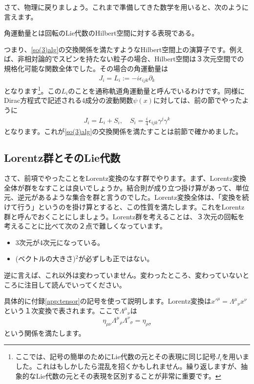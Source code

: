 \documentclass[report,paper=a4, fontsize=12pt, line_length=16cm, number_of_lines=33,dvipdfmx]{jlreq}
\newenvironment{myquote}{\begin{tcolorbox}[
  colback = blue!5, after = \noindent] }{\end{tcolorbox}}
\numberwithin{equation}{chapter}
\newcommand{\del}{\partial}
\begin{document}
さて、物理に戻りましょう。これまで準備してきた数学を用いると、次のように言えます。
\begin{myquote}
  角運動量とは回転のLie代数のHilbert空間に対する表現である。
\end{myquote}
つまり、\eqref{so(3)alg}の交換関係を満たすようなHilbert空間上の演算子です。例えば、非相対論的でスピンを持たない粒子の場合、Hilbert空間は３次元空間での規格化可能な関数全体でした。その場合の角運動量は
\begin{align}
  J_i=L_i:=-i\epsilon_{ijk}\del_{k}
\end{align}
となります\footnote{ここでは、記号の簡単のためにLie代数の元とその表現に同じ記号$J_i$を用いました。これはもしかしたら混乱を招くかもしれません。繰り返しますが、抽象的なLie代数の元とその表現を区別することが非常に重要です。}。この$L_i$のことを通称軌道角運動量と呼んでいるわけです。同様にDirac方程式で記述される4成分の波動関数$\psi(x)$に対しては、前の節でやったように
\begin{align}
  J_i=L_i+S_i,\quad S_i=\frac{i}{4}\epsilon_{ijk}\gamma^{j}\gamma^{k}\label{3dangularmomentum}
\end{align}
となります。これが\eqref{so(3)alg}の交換関係を満たすことは前節で確かめました。

\subsection{Lorentz群とそのLie代数}
さて、前項でやったことをLorentz変換のなす群でやります。まず、Lorentz変換全体が群をなすことは良いでしょうか。結合則が成り立つ掛け算があって、単位元、逆元があるような集合を群と言うのでした。Lorentz変換全体は、「変換を続けて行う」というのを掛け算とすると、この性質を満たします。これをLorentz群と呼んでおくことにしましょう。Lorentz群を考えることは、３次元の回転を考えることに比べて次の２点で難しくなっています。
\begin{itemize}
  \item 3次元が4次元になっている。
  \item (ベクトルの大きさ)${}^2$が必ずしも正ではない。
\end{itemize}
逆に言えば、これ以外は変わっていません。変わったところ、変わっていないところに注目して読んでいってください。

具体的に付録\ref{app:tensor}の記号を使って説明します。Lorentz変換は$x'^{\mu}=\Lambda^{\mu}{}_{\nu}x^{\nu}$という１次変換で表されます。ここで$\Lambda^{\mu}{}_{\nu}$は
\begin{align}
  \eta_{\mu\nu}\Lambda^{\mu}{}_{\rho}\Lambda^{\nu}{}_{\sigma}=\eta_{\rho\sigma}
  \label{Lorentztransf1}
\end{align}
という関係を満たします。
\end{document}
